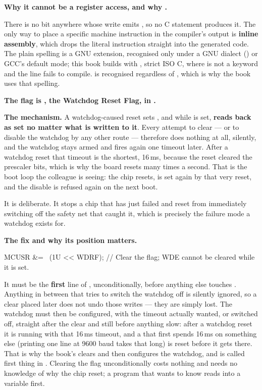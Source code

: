 \textbf{Why it cannot be a register access, and why .} 

There is no bit anywhere whose write emits , so no C statement produces it. The only way
to place a specific machine instruction in the compiler's output is \textbf{inline assembly}, which
drops the literal instruction straight into the generated code. The plain spelling  is a
GNU extension, recognised only under a GNU dialect () or GCC's default mode; this
book builds with , strict ISO C, where  is not a keyword and the line fails
to compile.  is recognised regardless of , which is why the book uses that
spelling.

\textbf{The flag is , the Watchdog Reset Flag, in .} 

\textbf{The mechanism.} A watchdog-caused reset sets , and while  is set,
 \textbf{reads back as set no matter what is written to it}. Every attempt to clear
 --- or to disable the watchdog by any other route --- therefore does nothing at all,
silently, and the watchdog stays armed and fires again one timeout later. After a watchdog reset
that timeout is the shortest, 16\,ms, because the reset cleared the prescaler bits, which is why the
board resets many times a second. That is the boot loop the colleague is seeing: the chip resets,
 is set again by that very reset, and the disable is refused again on the next boot.

It is deliberate. It stops a chip that has just failed and reset from immediately switching off the
safety net that caught it, which is precisely the failure mode a watchdog exists for.

\textbf{The fix and why its position matters.} 

\begin{ccode}
MCUSR &= ~(1U << WDRF); // Clear the flag; WDE cannot be cleared while it is set.
\end{ccode}

\noindent It must be the \textbf{first} line of , unconditionally, before anything
else touches . Anything in between that tries to switch the watchdog off is silently
ignored, so a clear placed later does not undo those writes --- they are simply lost. The watchdog
must then be configured, with the timeout actually wanted, or switched off, straight after the clear
and still before anything slow: after a watchdog reset it is running with that 16\,ms timeout, and a
 that first spends 16\,ms on something else (printing one line at 9600 baud takes
that long) is reset before it gets there. That is why the book's  clears
 and then configures the watchdog, and is called first thing in . Clearing
the flag unconditionally costs nothing and needs no knowledge of why the chip reset; a program that
wants to know reads  into a variable first.

